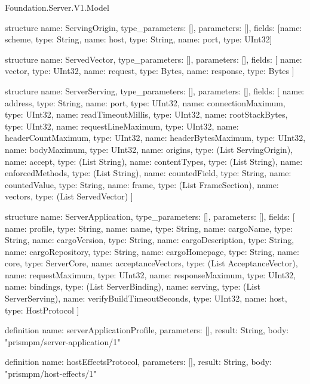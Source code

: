 \begin{lexlean}{Foundation.Server.V1.Model}
\begin{semanticmodule}
structure{
  name: ServingOrigin,
  type_parameters: [],
  parameters: [],
  fields: [{name: scheme, type: String}, {name: host, type: String}, {name: port, type: UInt32}]
}

structure{
  name: ServedVector,
  type_parameters: [],
  parameters: [],
  fields: [
    {name: vector, type: UInt32},
    {name: request, type: Bytes},
    {name: response, type: Bytes}
  ]
}

structure{
  name: ServerServing,
  type_parameters: [],
  parameters: [],
  fields: [
    {name: address, type: String},
    {name: port, type: UInt32},
    {name: connectionMaximum, type: UInt32},
    {name: readTimeoutMillis, type: UInt32},
    {name: rootStackBytes, type: UInt32},
    {name: requestLineMaximum, type: UInt32},
    {name: headerCountMaximum, type: UInt32},
    {name: headerBytesMaximum, type: UInt32},
    {name: bodyMaximum, type: UInt32},
    {name: origins, type: (List ServingOrigin)},
    {name: accept, type: (List String)},
    {name: contentTypes, type: (List String)},
    {name: enforcedMethods, type: (List String)},
    {name: countedField, type: String},
    {name: countedValue, type: String},
    {name: frame, type: (List FrameSection)},
    {name: vectors, type: (List ServedVector)}
  ]
}

structure{
  name: ServerApplication,
  type_parameters: [],
  parameters: [],
  fields: [
    {name: profile, type: String},
    {name: name, type: String},
    {name: cargoName, type: String},
    {name: cargoVersion, type: String},
    {name: cargoDescription, type: String},
    {name: cargoRepository, type: String},
    {name: cargoHomepage, type: String},
    {name: core, type: ServerCore},
    {name: acceptanceVectors, type: (List AcceptanceVector)},
    {name: requestMaximum, type: UInt32},
    {name: responseMaximum, type: UInt32},
    {name: bindings, type: (List ServerBinding)},
    {name: serving, type: (List ServerServing)},
    {name: verifyBuildTimeoutSeconds, type: UInt32},
    {name: host, type: HostProtocol}
  ]
}

definition{
  name: serverApplicationProfile,
  parameters: [],
  result: String,
  body: "prismpm/server-application/1"
}

definition{
  name: hostEffectsProtocol,
  parameters: [],
  result: String,
  body: "prismpm/host-effects/1"
}
\end{semanticmodule}
\end{lexlean}
